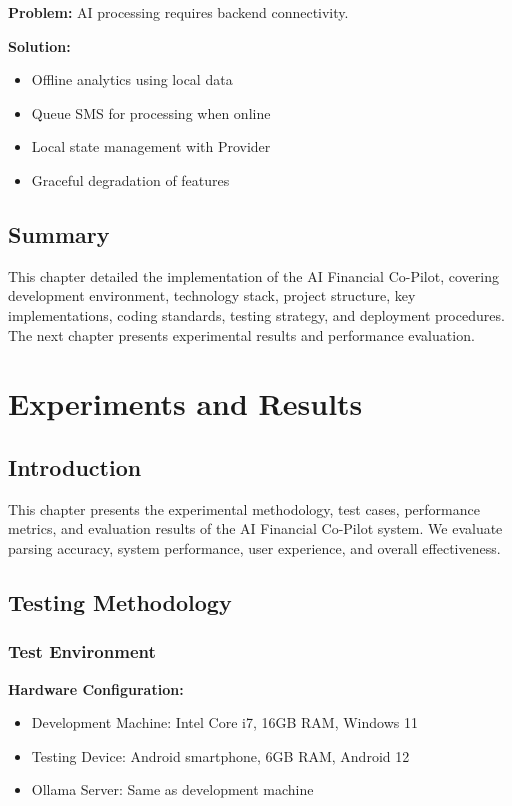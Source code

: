 \documentclass[11pt,a4paper]{report}
\begin{document}
\begin{itemize}
\begin{itemize}
\textbf{Problem:} AI processing requires backend connectivity.

\textbf{Solution:}
\begin{itemize}
    \item Offline analytics using local data
    \item Queue SMS for processing when online
    \item Local state management with Provider
    \item Graceful degradation of features
\end{itemize}

\section{Summary}

This chapter detailed the implementation of the AI Financial Co-Pilot, covering development environment, technology stack, project structure, key implementations, coding standards, testing strategy, and deployment procedures. The next chapter presents experimental results and performance evaluation.

\chapter{Experiments and Results}

\section{Introduction}

This chapter presents the experimental methodology, test cases, performance metrics, and evaluation results of the AI Financial Co-Pilot system. We evaluate parsing accuracy, system performance, user experience, and overall effectiveness.

\section{Testing Methodology}

\subsection{Test Environment}

\textbf{Hardware Configuration:}
\begin{itemize}
    \item Development Machine: Intel Core i7, 16GB RAM, Windows 11
    \item Testing Device: Android smartphone, 6GB RAM, Android 12
    \item Ollama Server: Same as development machine
\end{itemize}


\end{itemize}
\end{itemize}
\end{document}
